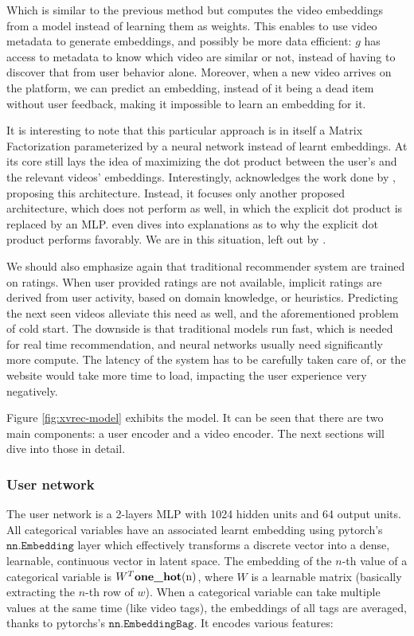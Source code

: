 Which is similar to the previous method but computes the video embeddings from a model instead of learning them as weights. This enables to use video metadata to generate embeddings, and possibly be more data efficient: $g$ has access to metadata to know which video are similar or not, instead of having to discover that from user behavior alone. Moreover, when a new video arrives on the platform, we can predict an embedding, instead of it being a dead item without user feedback, making it impossible to learn an embedding for it.


It is interesting to note that this particular approach is in itself a Matrix Factorization parameterized by a neural network instead of learnt embeddings. At its core still lays the idea of maximizing the dot product between the user's and the relevant videos' embeddings. Interestingly, \citet{dlinrec} acknowledges the work done by \citet{neumf}, proposing this architecture. Instead, it focuses only another proposed architecture, which does not perform as well, in which the explicit dot product is replaced by an \acf{MLP}. \citet{neumf} even dives into explanations as to why the explicit dot product performs favorably. We are in this situation, left out by \citet{dlinrec}.

We should also emphasize again that traditional recommender system are trained on ratings. When user provided ratings are not available, implicit ratings are derived from user activity, based on domain knowledge, or heuristics. Predicting the next seen videos alleviate this need as well, and the aforementioned problem of cold start. The downside is that traditional models run fast, which is needed for real time recommendation, and neural networks usually need significantly more compute. The latency of the system has to be carefully taken care of, or the website would take more time to load, impacting the user experience very negatively.

Figure \ref{fig:xvrec-model} exhibits the model. It can be seen that there are two main components: a user encoder and a video encoder. The next sections will dive into those in detail.

\subsubsection{User network}

The user network is a 2-layers \ac{MLP} with 1024 hidden units and 64 output units. All categorical variables have an associated learnt embedding using pytorch's $\texttt{nn.Embedding}$ layer which effectively transforms a discrete vector into a dense, learnable, continuous vector in latent space. The embedding of the $n$-th value of a categorical variable is $W^T \text{\textbf{one\_hot}(n)}$, where $W$ is a learnable matrix (basically extracting the $n$-th row of $w$). When a categorical variable can take multiple values at the same time (like video tags), the embeddings of all tags are averaged, thanks to pytorchs's $\texttt{nn.EmbeddingBag}$. It encodes various features:

